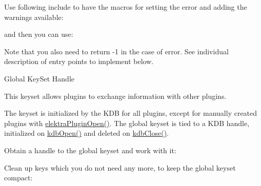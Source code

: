 \begin{DoxyCodeInclude}{0}
\end{DoxyCodeInclude}
 Use following include to have the macros for setting the error and adding the warnings available\+:


\begin{DoxyCodeInclude}{0}
\DoxyCodeLine{\textcolor{comment}{// using namespace ckdb; // for C++}}
\end{DoxyCodeInclude}
 and then you can use\+:


\begin{DoxyCodeInclude}{0}
\end{DoxyCodeInclude}
 Note that you also need to return -\/1 in the case of error. See individual description of entry points to implement below.

\begin{DoxyParagraph}{Global Key\+Set Handle}

\end{DoxyParagraph}
This keyset allows plugins to exchange information with other plugins.

The keyset is initialized by the K\+DB for all plugins, except for manually created plugins with {\ttfamily \mbox{\hyperlink{elektra_2plugin_8c_a32a70a7876542c51d153164ac5108a57}{elektra\+Plugin\+Open()}}}. The global keyset is tied to a K\+DB handle, initialized on {\ttfamily \mbox{\hyperlink{group__kdb_ga6808defe5870f328dd17910aacbdc6ca}{kdb\+Open()}}} and deleted on {\ttfamily \mbox{\hyperlink{group__kdb_gadb54dc9fda17ee07deb9444df745c96f}{kdb\+Close()}}}.

Obtain a handle to the global keyset and work with it\+:


\begin{DoxyCodeInclude}{0}
\DoxyCodeLine{        \textcolor{comment}{// now we can read something from the global keyset}}
\DoxyCodeLine{        \textcolor{comment}{// or add something for us or others to read}}
\end{DoxyCodeInclude}
 Clean up keys which you do not need any more, to keep the global keyset compact\+:


